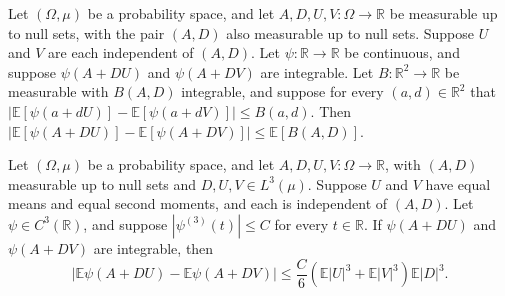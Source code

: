 \begin{theorem}
\label{BooleanAnalysis.GaussianSpace.independent_affine_comparison_bound}
\leanok
{}
Let $(\Omega,\mu)$ be a probability space, and let $A,D,U,V\colon\Omega\to\mathbb R$ be
measurable up to null sets, with the pair $(A,D)$ also measurable up to null sets.
Suppose $U$ and $V$ are each independent of $(A,D)$. Let $\psi\colon\mathbb R\to\mathbb
R$ be continuous, and suppose $\psi(A+DU)$ and $\psi(A+DV)$ are integrable. Let
$B\colon\mathbb R^2\to\mathbb R$ be measurable with $B(A,D)$ integrable, and suppose for
every $(a,d)\in\mathbb R^2$ that $\left|\mathbb E[\psi(a+dU)]-\mathbb
E[\psi(a+dV)]\right|\le B(a,d)$. Then $\left|\mathbb E[\psi(A+DU)]-\mathbb
E[\psi(A+DV)]\right|\le\mathbb E[B(A,D)]$.
\end{theorem}

\begin{theorem}
\label{BooleanAnalysis.GaussianSpace.independent_affine_replacement_bound_c3}
\leanok
{}
Let $(\Omega,\mu)$ be a probability space, and let $A,D,U,V\colon\Omega\to\mathbb R$,
with $(A,D)$ measurable up to null sets and $D,U,V\in L^3(\mu)$. Suppose $U$ and $V$
have equal means and equal second moments, and each is independent of $(A,D)$. Let
$\psi\in C^3(\mathbb R)$, and suppose $|\psi^{(3)}(t)|\le C$ for every $t\in\mathbb R$.
If $\psi(A+DU)$ and $\psi(A+DV)$ are integrable, then
\[\left|\mathbb E\psi(A+DU)-\mathbb E\psi(A+DV)\right|\le \frac C6\left(\mathbb E|U|^3+\mathbb E|V|^3\right)\mathbb E|D|^3.\]
\end{theorem}
